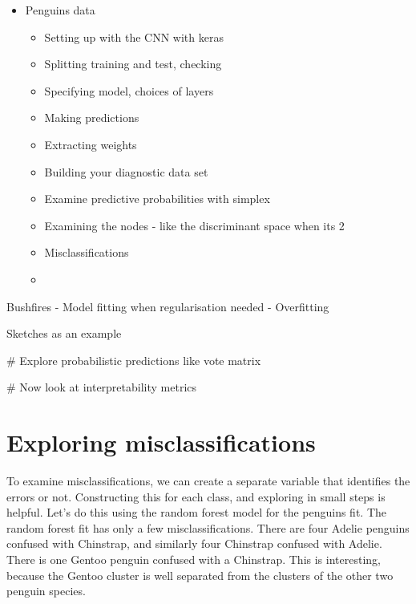 \documentclass[
  letterpaper,
]{krantz}
\newenvironment{Shaded}{\begin{snugshade}}{\end{snugshade}}
\newcommand{\CommentTok}[1]{\textcolor[rgb]{0.37,0.37,0.37}{#1}}
\providecommand{\tightlist}{%
  \setlength{\itemsep}{0pt}\setlength{\parskip}{0pt}}\usepackage{longtable,booktabs,array}
\begin{document}
\begin{itemize}
\tightlist
\item
  Penguins data

  \begin{itemize}
  \tightlist
  \item
    Setting up with the CNN with keras
  \item
    Splitting training and test, checking
  \item
    Specifying model, choices of layers
  \item
    Making predictions
  \item
    Extracting weights
  \item
    Building your diagnostic data set
  \item
    Examine predictive probabilities with simplex
  \item
    Examining the nodes - like the discriminant space when its 2
  \item
    Misclassifications
  \item
  \end{itemize}
\end{itemize}

Bushfires - Model fitting when regularisation needed - Overfitting

Sketches as an example


\begin{Shaded}
\begin{Highlighting}[]
\CommentTok{\# Explore probabilistic predictions like vote matrix}
\end{Highlighting}
\end{Shaded}

\begin{Shaded}
\begin{Highlighting}[]
\CommentTok{\# Now look at interpretability metrics}
\end{Highlighting}
\end{Shaded}

\hypertarget{exploring-misclassifications}{%
\chapter{Exploring
misclassifications}\label{exploring-misclassifications}}


To examine misclassifications, we can create a separate variable that
identifies the errors or not. Constructing this for each class, and
exploring in small steps is helpful. Let's do this using the random
forest model for the penguins fit. The random forest fit has only a few
misclassifications. There are four Adelie penguins confused with
Chinstrap, and similarly four Chinstrap confused with Adelie. There is
one Gentoo penguin confused with a Chinstrap. This is interesting,
because the Gentoo cluster is well separated from the clusters of the
other two penguin species.
\end{document}
